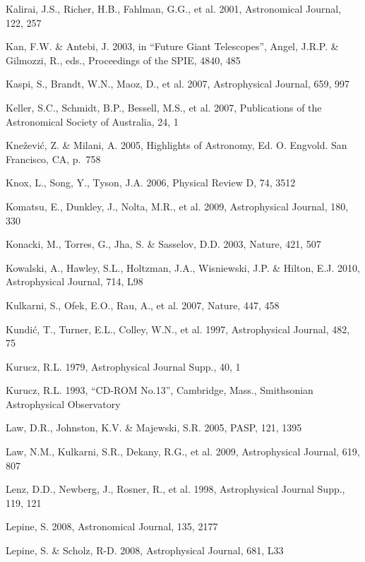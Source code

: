 \documentclass{emulateapj}
\begin{document}
\begin{thebibliography}{}
\bibitem[()]{} Kalirai, J.S., Richer, H.B., Fahlman, G.G., et al. 2001, Astronomical Journal, 122, 257
	
\bibitem[()]{} Kan, F.W. \& Antebi, J. 2003, in ``Future Giant Telescopes'', Angel, J.R.P. \& Gilmozzi, R., 
             eds., Proceedings of the SPIE, 4840, 485


\bibitem[()]{} Kaspi, S., Brandt, W.N., Maoz, D., et al. 2007, Astrophysical Journal, 659, 997

\bibitem[()]{} Keller, S.C., Schmidt, B.P., Bessell, M.S., et al. 2007, Publications of the Astronomical 
             Society of Australia, 24, 1

\bibitem[()]{} Kne\v{z}evi\'{c}, Z. \& Milani, A. 2005, Highlights of Astronomy, Ed. O. Engvold. San 
             Francisco, CA, p.~758

\bibitem[()]{} Knox, L., Song, Y., Tyson, J.A. 2006, Physical Review D, 74, 3512 

\bibitem[()]{} Komatsu, E., Dunkley, J., Nolta, M.R., et al. 2009, Astrophysical Journal, 180, 330 
	
\bibitem[()]{} Konacki, M., Torres, G., Jha, S. \& Sasselov, D.D. 2003, Nature, 421, 507

\bibitem[()]{} Kowalski, A., Hawley, S.L., Holtzman, J.A., Wisniewski, J.P. \& Hilton, E.J. 2010, Astrophysical Journal, 714, L98

\bibitem[()]{} Kulkarni, S., Ofek, E.O., Rau, A., et al.  2007, Nature, 447, 458

\bibitem[()]{} Kundi\'{c}, T., Turner, E.L., Colley, W.N., et al. 1997, Astrophysical Journal, 482, 75

\bibitem[()]{} Kurucz, R.L. 1979, Astrophysical Journal Supp., 40, 1

\bibitem[()]{} Kurucz, R.L. 1993, ``CD-ROM No.13”, Cambridge, Mass., Smithsonian Astrophysical Observatory

\bibitem[()]{} Law, D.R., Johnston, K.V. \& Majewski, S.R. 2005,  PASP, 121, 1395

\bibitem[()]{} Law, N.M., Kulkarni, S.R., Dekany, R.G., et al. 2009, Astrophysical Journal, 619, 807

\bibitem[()]{} Lenz, D.D., Newberg, J., Rosner, R., et al. 1998, Astrophysical Journal Supp., 119, 121

\bibitem[()]{} Lepine, S. 2008, Astronomical Journal, 135, 2177

\bibitem[()]{} Lepine, S. \& Scholz, R-D. 2008, Astrophysical Journal, 681, L33


\end{thebibliography}
\end{document}
